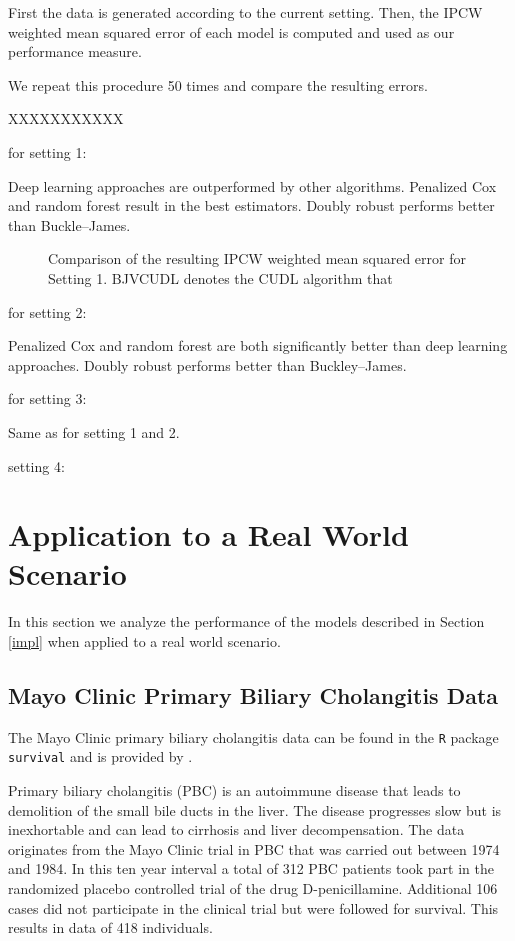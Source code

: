 \documentclass[12pt, a4paper]{scrartcl}
\theoremstyle{definition}
\theoremstyle{plain}
\numberwithin{equation}{section}
\numberwithin{figure}{section}
\numberwithin{table}{section}
\begin{document}
	First the data is generated according to the current setting.
	Then, the IPCW weighted mean squared error of each  model is computed and used as our performance measure.
	
	We repeat this procedure 50 times and compare the resulting errors.
	
	XXXXXXXXXXX
	
	for setting 1:
	
	Deep learning approaches are outperformed by other algorithms.
	Penalized Cox and random forest result in the best estimators.
	Doubly robust performs better than Buckle--James.
	
	\begin{figure}
		\centering	
		
		\vspace{-0.3cm}
		\caption{Comparison of the resulting IPCW weighted mean squared error for Setting 1. BJVCUDL denotes the CUDL algorithm that}
 	\end{figure}
	
	for setting 2:
	
	Penalized Cox and random forest are both significantly better than deep learning approaches.
	Doubly robust performs better than Buckley--James.
	
	for setting 3:
	
	Same as for setting 1 and 2.
	
	setting 4:
	
	

	\newpage
	\section{Application to a Real World Scenario}
	In this section we analyze the performance of the models described in Section \ref{impl} when applied to a real world scenario.
	
	\subsection{Mayo Clinic Primary Biliary Cholangitis Data}
	The Mayo Clinic primary biliary cholangitis data can be found in the \texttt{R} package \texttt{survival} and is provided by \citet*{survival-book}.
	
	Primary biliary cholangitis (PBC) is an autoimmune disease that leads to demolition of the small bile ducts in the liver.
	The disease progresses slow but is inexhortable and can lead to cirrhosis and liver decompensation.
	The data originates from the Mayo Clinic trial in PBC that was carried out between 1974 and 1984.
	In this ten year interval a total of 312 PBC patients took part in the randomized placebo controlled trial of the drug D-penicillamine.
	Additional 106 cases did not participate in the clinical trial but were followed for survival.
	This results in data of 418 individuals.
	
\end{document}

